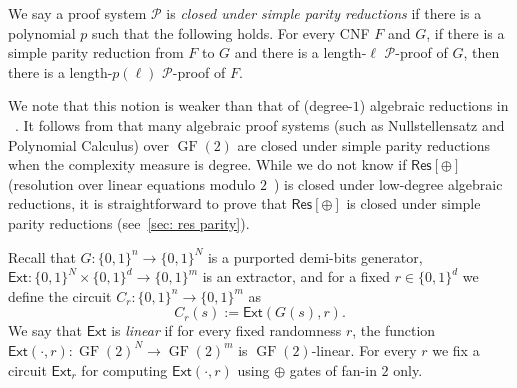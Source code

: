 \documentclass[10pt,a4paper]{article}
\theoremstyle{definition}
\theoremstyle{remark}
\DeclareMathOperator{\GF}{GF}
\newcommand{\Ext}{\mathsf{Ext}}
\newcommand{\Res}{\mathsf{Res}}
\newcommand{\calP}{\mathcal{P}}
\begin{document}
We say a proof system $\calP$ is \emph{closed under simple parity reductions} if there is a polynomial $p$ such that the following holds. For every CNF $F$ and $G$, if there is a simple parity reduction from $F$ to $G$ and there is a length-$\ell$ $\calP$-proof of $G$, then there is a length-$p(\ell)$ $\calP$-proof of $F$.

We note that this notion is weaker than that of (degree-$1$) algebraic reductions in ~\cite{BussGIP01, DBLP:conf/stoc/RezendeGNPR021}. It follows from \cite[Lemma 8.3]{DBLP:conf/stoc/RezendeGNPR021} that many algebraic proof systems (such as Nullstellensatz and Polynomial Calculus) over $\GF(2)$ are closed under simple parity reductions when the complexity measure is degree. While we do not know if $\Res[\oplus]$ (resolution over linear equations modulo $2$~\cite{ItsyksonS20}) is closed under low-degree algebraic reductions, it is straightforward to prove that $\Res[\oplus]$ is closed under simple parity reductions (see~\autoref{sec: res parity}).



Recall that $G:\{0, 1\}^n \to \{0, 1\}^N$ is a purported demi-bits generator, $\Ext: \{0, 1\}^N\times \{0, 1\}^d \to \{0, 1\}^m$ is an extractor, and for a fixed $r\in\{0, 1\}^d$ we define the circuit $C_r: \{0, 1\}^n \to \{0, 1\}^m$ as
\[C_r(s) := \Ext(G(s), r).\]
We say that $\Ext$ is \emph{linear} if for every fixed randomness $r$, the function $\Ext(\cdot, r): \GF(2)^N \to \GF(2)^m$ is $\GF(2)$-linear. For every $r$ we fix a circuit $\Ext_r$ for computing $\Ext(\cdot, r)$ using $\oplus$ gates of fan-in $2$ only.
\end{document}
